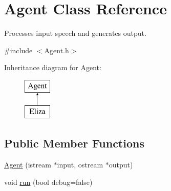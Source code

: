\hypertarget{classAgent}{}\section{Agent Class Reference}
\label{classAgent}


Processes input speech and generates output.  




{\ttfamily \#include $<$Agent.\+h$>$}

Inheritance diagram for Agent\+:\begin{figure}[H]
\begin{center}
\leavevmode
\includegraphics[height=2.000000cm]{classAgent}
\end{center}
\end{figure}
\subsection*{Public Member Functions}
\begin{DoxyCompactItemize}
\item 
\mbox{\hyperlink{classAgent_a3db4a9cfcea636c9d63ec73729225fc8}{Agent}} (istream $\ast$input, ostream $\ast$output)
\item 
void \mbox{\hyperlink{classAgent_a5e176f9a9b2a9269506cc172c1e2b897}{run}} (bool debug=false)
\end{DoxyCompactItemize}
